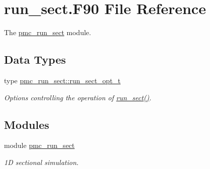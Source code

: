 \hypertarget{run__sect_8_f90}{}\section{run\+\_\+sect.\+F90 File Reference}
\label{run__sect_8_f90}


The \mbox{\hyperlink{namespacepmc__run__sect}{pmc\+\_\+run\+\_\+sect}} module.  


\subsection*{Data Types}
\begin{DoxyCompactItemize}
\item 
type \mbox{\hyperlink{structpmc__run__sect_1_1run__sect__opt__t}{pmc\+\_\+run\+\_\+sect\+::run\+\_\+sect\+\_\+opt\+\_\+t}}
\begin{DoxyCompactList}\small\item\em Options controlling the operation of \mbox{\hyperlink{namespacepmc__run__sect_a98f7b8811139683010e8a70346452ac2}{run\+\_\+sect()}}. \end{DoxyCompactList}\end{DoxyCompactItemize}
\subsection*{Modules}
\begin{DoxyCompactItemize}
\item 
module \mbox{\hyperlink{namespacepmc__run__sect}{pmc\+\_\+run\+\_\+sect}}
\begin{DoxyCompactList}\small\item\em 1D sectional simulation. \end{DoxyCompactList}\end{DoxyCompactItemize}
